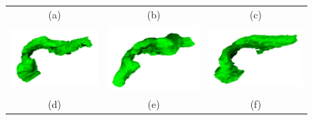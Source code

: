 \begin{figure}[h!]
\begin{center}
{\begin{tabular}{ccc}
				(a) &  (b)  & (c) \\
				\includegraphics[scale=0.4]{Genel-Bilgiler/Figures/68gt3D.png} & \includegraphics[scale=0.4]{Genel-Bilgiler/Figures/70gt3D.png} & \includegraphics[scale=0.4]{Genel-Bilgiler/Figures/74gt3D.png} \\
				(d) &  (e)  & (f) 
			\end{tabular}
		}
	\end{center}
\end{figure}


